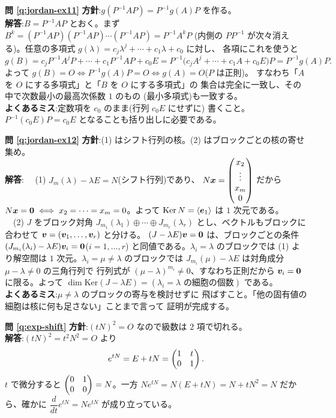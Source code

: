\bigskip
\noindent\textbf{問 \ref{q:jordan-ex11}}\quad
\textbf{方針}:$g(P^{-1}AP) = P^{-1}g(A)P$ を作る。\\
\textbf{解答}:$B = P^{-1}AP$ とおく。まず
$B^k = (P^{-1}AP)(P^{-1}AP)\cdots(P^{-1}AP) = P^{-1}A^kP$
(内側の $PP^{-1}$ が次々消える)。任意の多項式
$g(\lambda) = c_j\lambda^j + \cdots + c_1\lambda + c_0$ に対し、
各項にこれを使うと
\[
g(B) = c_j P^{-1}A^jP + \cdots + c_1 P^{-1}AP + c_0 E
= P^{-1}\bigl(c_j A^j + \cdots + c_1 A + c_0 E\bigr)P = P^{-1}g(A)P.
\]
よって $g(B) = O \iff P^{-1}g(A)P = O \iff g(A) = O$($P$ は正則)。
すなわち「$A$ を $O$ にする多項式」と「$B$ を $O$ にする多項式」の
集合は完全に一致し、その中で次数最小の最高次係数 $1$ のもの
(最小多項式)も一致する。\\
\textbf{よくあるミス}:定数項を $c_0$ のまま(行列 $c_0 E$ にせずに)
書くこと。$P^{-1}(c_0 E)P = c_0 E$ となることも括り出しに必要である。

\bigskip
\noindent\textbf{問 \ref{q:jordan-ex12}}\quad
\textbf{方針}:(1) はシフト行列の核。(2) はブロックごとの核の寄せ集め。\\
\textbf{解答}:
　(1) $J_m(\lambda) - \lambda E = N$(シフト行列)であり、
$N\bm{x} = \begin{pmatrix}x_2 \\ \vdots \\ x_m \\ 0\end{pmatrix}$ だから
$N\bm{x} = \bm{0} \iff x_2 = \cdots = x_m = 0$。よって
$\mathrm{Ker}\,N = \langle \bm{e}_1 \rangle$ は $1$ 次元である。\\
　(2) $J$ をブロック対角 $J_{m_1}(\lambda_1) \oplus \cdots \oplus
J_{m_r}(\lambda_r)$ とし、ベクトルもブロックに合わせて
$\bm{v} = (\bm{v}_1, \dots, \bm{v}_r)$ と分ける。
$(J - \lambda E)\bm{v} = \bm{0}$ は、ブロックごとの条件
$(J_{m_i}(\lambda_i) - \lambda E)\bm{v}_i = \bm{0}$($i = 1, \dots, r$)
と同値である。$\lambda_i = \lambda$ のブロックでは (1) より解空間は
$1$ 次元。$\lambda_i = \mu \neq \lambda$ のブロックでは
$J_{m_i}(\mu) - \lambda E$ は対角成分 $\mu - \lambda \neq 0$ の三角行列で
行列式が $(\mu - \lambda)^{m_i} \neq 0$、すなわち正則だから
$\bm{v}_i = \bm{0}$ に限る。よって
$\dim \mathrm{Ker}(J - \lambda E) = (\lambda_i = \lambda
\text{ の細胞の個数})$ である。\\
\textbf{よくあるミス}:$\mu \neq \lambda$ のブロックの寄与を検討せずに
飛ばすこと。「他の固有値の細胞は核に何も足さない」ことまで言って
証明が完成する。

\bigskip
\noindent\textbf{問 \ref{q:exp-shift}}\quad
\textbf{方針}:$(tN)^2 = O$ なので級数は $2$ 項で切れる。\\
\textbf{解答}:$(tN)^2 = t^2N^2 = O$ より
\[
e^{tN} = E + tN = \begin{pmatrix}1 & t \\ 0 & 1\end{pmatrix}.
\]
$t$ で微分すると $\begin{pmatrix}0 & 1 \\ 0 & 0\end{pmatrix} = N$。一方
$N e^{tN} = N(E + tN) = N + tN^2 = N$ だから、確かに
$\dfrac{d}{dt}e^{tN} = Ne^{tN}$ が成り立っている。

